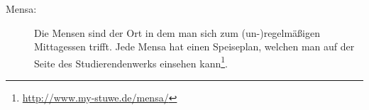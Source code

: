 \begin{description}
\item[Mensa:] Die Mensen sind der Ort in dem man sich zum (un-)regelmäßigen Mittagessen trifft. Jede Mensa hat einen Speiseplan, welchen man auf der Seite des Studierendenwerks einsehen kann\footnote{\url{http://www.my-stuwe.de/mensa/}}.

\vfill


\pagebreak
%
%
\end{description}

